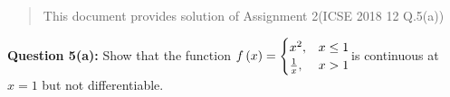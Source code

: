 \documentclass[journal,12pt,twocolumn]{IEEEtran}
\begin{document}
% 
\maketitle
\newpage
\bigskip
\begin{abstract}
   This document provides solution of Assignment 2(ICSE 2018 12 Q.5(a))
\end{abstract}
 \textbf{ Question 5(a):}
   Show that the function $ f\left(x\right) = \begin{cases}
                                         x^2, & x \leq 1 \\ 
                                        \frac{1}{x}, & x > 1
                                        \end{cases}$is continuous at $ x = 1 $ but not differentiable.\\
\end{document}
